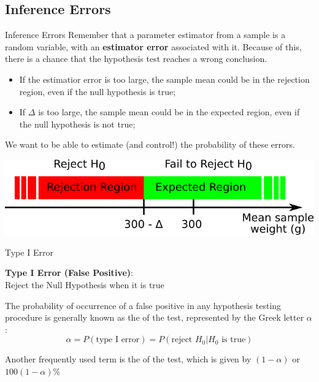 \subsection{Inference Errors}
\begin{frame}{Inference Errors}
  Remember that a parameter estimator from a sample is a random variable, with an {\bf estimator error} associated with it. Because of this, there is a chance that the hypothesis test reaches a \alert{wrong conclusion}.\bigskip

  \begin{itemize}
    \item If the estimatior error is too large, the sample mean could be in the rejection region, even if the null hypothesis is true;\medskip
    \item If $\Delta$ is too large, the sample mean could be in the expected region, even if the null hypothesis is not true;
  \end{itemize}\bigskip

  We want to be able to estimate (and control!) the probability of these errors.

  \begin{center}
    \includegraphics[width=.8\textwidth]{../img/critical_region}
  \end{center}
\end{frame}

\begin{frame}{Type I Error}
  \begin{block}{}
    {\bf Type I Error (False Positive)}:\\
      \hspace{1cm}Reject the Null Hypothesis when it is true
  \end{block}\medskip

  The probability of occurrence of a false positive in any hypothesis testing procedure is generally known as the  of the test, represented by the Greek letter $\alpha$:
  \begin{equation*}
    \alpha = P(\text{type I error}) = P(\text{reject }H_0|H_0\text{ is true})
  \end{equation*}
  \bigskip

  Another frequently used term is the  of the test, which is given by $(1-\alpha)$ or $100(1-\alpha)$\%
\end{frame}


